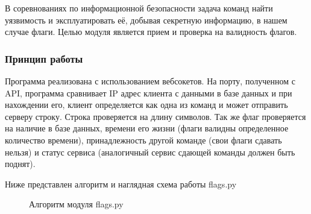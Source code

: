 В соревнованиях по информационной безопасности задача команд найти уязвимость и эксплуатировать её, добывая секретную информацию, в нашем случае флаги. Целью модуля является прием и проверка на валидность флагов.

\subsubsection{Принцип работы}

Программа реализована с использованием вебсокетов. На порту, полученном с API, программа сравнивает IP адрес клиента с данными в базе данных и при нахождении его, клиент определяется как одна из команд и может отправить серверу строку. Строка проверяется на длину символов. Так же флаг проверяется на наличие в базе данных, времени его жизни (флаги валидны определенное количество времени), принадлежность другой команде (свои флаги сдавать нельзя) и статус сервиса (аналогичный сервис сдающей команды должен быть поднят). 

Ниже представлен алгоритм и наглядная схема работы flags.py

\begin{figure}[h!]
\caption{Алгоритм модуля flags.py}
\end{figure} 

